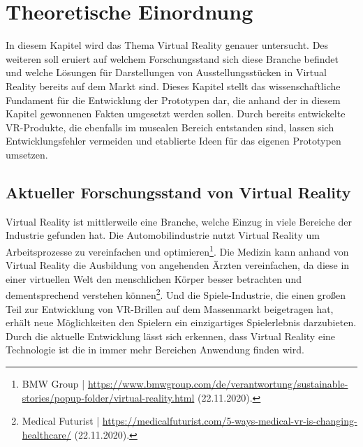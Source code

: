 \documentclass[a4paper,12pt,oneside]{article}
\begin{document}
  \section{Theoretische Einordnung}
    In diesem Kapitel wird das Thema Virtual Reality genauer untersucht. Des weiteren
    soll eruiert
    auf welchem
    Forschungsstand sich diese Branche befindet und welche Lösungen für Darstellungen
    von Ausstellungsstücken in Virtual Reality bereits auf 
    dem Markt sind. Dieses Kapitel stellt das
    wissenschaftliche Fundament für die Entwicklung der Prototypen dar, die anhand der in
    diesem Kapitel gewonnenen Fakten umgesetzt werden sollen.
    Durch bereits entwickelte VR-Produkte, die ebenfalls im musealen Bereich entstanden sind,
    lassen sich Entwicklungsfehler vermeiden und etablierte Ideen für das eigenen
    Prototypen umsetzen.
    \subsection{Aktueller Forschungsstand von Virtual Reality}
      Virtual Reality ist mittlerweile eine Branche, welche Einzug in viele Bereiche der
      Industrie gefunden hat. Die Automobilindustrie nutzt Virtual Reality um Arbeitsprozesse
      zu vereinfachen und optimieren\footnote{BMW Group | \url{https://www.bmwgroup.com/de/verantwortung/sustainable-stories/popup-folder/virtual-reality.html} (22.11.2020).}. 
      Die Medizin kann anhand von Virtual Reality die
      Ausbildung von angehenden Ärzten vereinfachen, da diese in einer virtuellen Welt
      den menschlichen Körper besser betrachten und dementsprechend verstehen können\footnote{Medical Futurist | \url{https://medicalfuturist.com/5-ways-medical-vr-is-changing-healthcare/} (22.11.2020).}. 
      Und die Spiele-Industrie, die einen großen Teil zur Entwicklung von
      VR-Brillen auf dem Massenmarkt beigetragen hat, erhält neue Möglichkeiten 
      den Spielern ein einzigartiges Spielerlebnis darzubieten. Durch die aktuelle
      Entwicklung lässt sich erkennen, dass Virtual Reality eine Technologie ist die
      in immer mehr Bereichen Anwendung finden wird.
\end{document}
